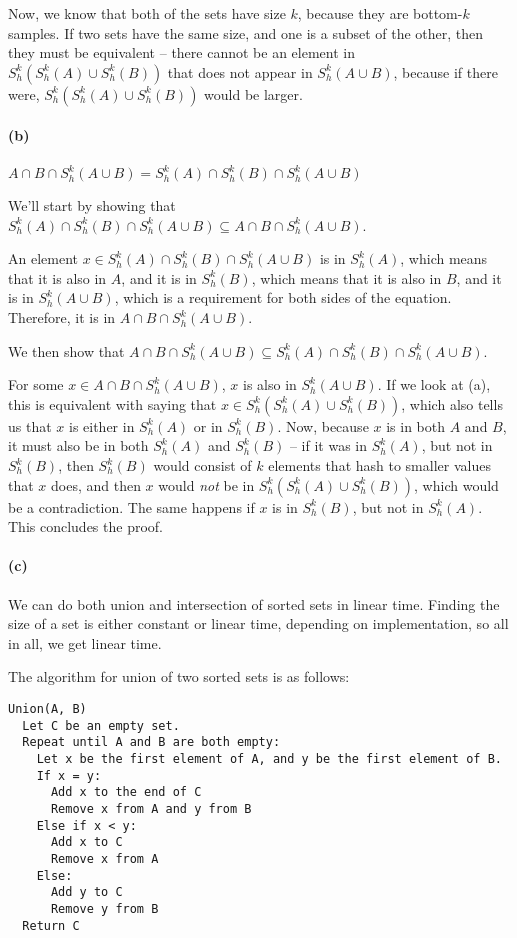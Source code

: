 Now, we know that both of the sets have size $k$, because they are bottom-$k$ samples. If two sets have the same size, and one is a subset of the other, then they must be equivalent -- there cannot be an element in $S^k_h(S^k_h(A) \cup S^k_h(B))$ that does not appear in $S^k_h(A \cup B)$, because if there were, $S^k_h(S^k_h(A) \cup S^k_h(B))$ would be larger.

\paragraph*{(b)}
$A \cap B \cap S^k_h(A \cup B) = S^k_h(A) \cap S^k_h(B) \cap S^k_h(A \cup B)$

We'll start by showing that $S^k_h(A) \cap S^k_h(B) \cap S^k_h(A \cup B) \subseteq A \cap B \cap S^k_h(A \cup B)$.

An element $x \in S^k_h(A) \cap S^k_h(B) \cap S^k_h(A \cup B)$ is in $S^k_h(A)$, which means that it is also in $A$, and it is in $S^k_h(B)$, which means that it is also in $B$, and it is in $S^k_h(A \cup B)$, which is a requirement for both sides of the equation. Therefore, it is in $A \cap B \cap S^k_h(A \cup B)$.

We then show that $A \cap B \cap S^k_h(A \cup B) \subseteq S^k_h(A) \cap S^k_h(B) \cap S^k_h(A \cup B)$.

For some $x \in A \cap B \cap S^k_h(A \cup B)$, $x$ is also in $S^k_h(A \cup B)$. If we look at (a), this is equivalent with saying that $x \in S^k_h(S^k_h(A) \cup S^k_h(B))$, which also tells us that $x$ is either in $S^k_h(A)$ or in $S^k_h(B)$. Now, because $x$ is in both $A$ and $B$, it must also be in both $S^k_h(A)$ and $S^k_h(B)$ -- if it was in $S^k_h(A)$, but not in $S^k_h(B)$, then $S^k_h(B)$ would consist of $k$ elements that hash to smaller values that $x$ does, and then $x$ would \emph{not} be in $S^k_h(S^k_h(A) \cup S^k_h(B))$, which would be a contradiction. The same happens if $x$ is in $S^k_h(B)$, but not in $S^k_h(A)$. This concludes the proof.

\paragraph*{(c)}
We can do both union and intersection of sorted sets in linear time. Finding the size of a set is either constant or linear time, depending on implementation, so all in all, we get linear time.

The algorithm for union of two sorted sets is as follows:

\begin{verbatim}
Union(A, B)
  Let C be an empty set.
  Repeat until A and B are both empty:
    Let x be the first element of A, and y be the first element of B.
    If x = y:
      Add x to the end of C
      Remove x from A and y from B
    Else if x < y:
      Add x to C
      Remove x from A
    Else:
      Add y to C
      Remove y from B
  Return C
\end{verbatim}

